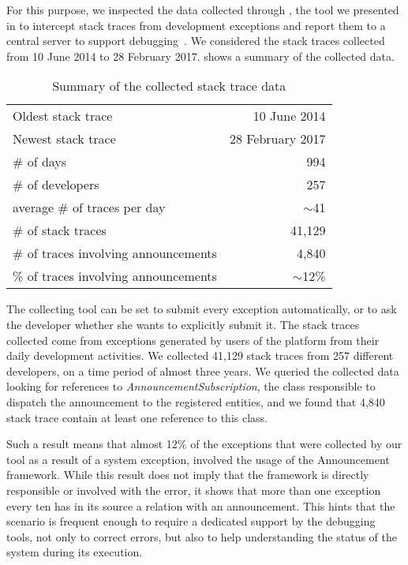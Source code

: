 For this purpose, we inspected the data collected through \sln, the tool we presented in  to intercept stack traces from development exceptions and report them to a central server to support debugging~\cite{DalS2015a}.
We considered the stack traces collected from 10 June 2014 to 28 February 2017.
 shows a summary of the collected data.

\begin{table}[h]
\centering
\caption{Summary of the collected stack trace data}
\begin{tabular}{lr}
\hline
Oldest stack trace & 10 June 2014 \\
Newest stack trace & 28 February 2017 \\
\# of days & 994\\
\# of developers & 257\\
average \# of traces per day & $\sim$41\\
\# of stack traces & 41,129 \\
\# of traces involving announcements & 4,840 \\
\% of traces involving announcements & $\sim$12\% \\
\hline
\end{tabular}
\label{tab:stack-traces}
\end{table}


The collecting tool can be set to submit every exception automatically, or to ask the developer whether she wants to explicitly submit it.
The stack traces collected come from exceptions generated by users of the \pha platform from their daily development activities.
We collected 41,129 stack traces from 257 different developers, on a time period of almost three years.
We queried the collected data looking for references to \textit{AnnouncementSubscription}, the class responsible to dispatch the announcement to the registered entities, and we found that 4,840 stack trace contain at least one reference to this class.

Such a result means that almost 12\% of the exceptions that were collected by our tool as a result of a system exception, involved the usage of the Announcement framework.
While this result does not imply that the framework is directly responsible or involved with the error, it shows that more than one exception every ten has in its source a relation with an announcement.
This hints that the scenario is frequent enough to require a dedicated support by the debugging tools, not only to correct errors, but also to help understanding the status of the system during its execution.


